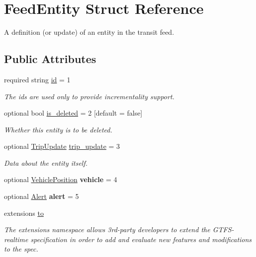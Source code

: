 \hypertarget{structFeedEntity}{}\section{Feed\+Entity Struct Reference}
\label{structFeedEntity}


A definition (or update) of an entity in the transit feed.  


\subsection*{Public Attributes}
\begin{DoxyCompactItemize}
\item 
required string \hyperlink{structFeedEntity_ad96aa1c86c0940151a63b55e75bd9197}{id} = 1
\begin{DoxyCompactList}\small\item\em The ids are used only to provide incrementality support. \end{DoxyCompactList}\item 
optional bool \hyperlink{structFeedEntity_aacce46cb6514b5ad2cf66559abdcfba3}{is\+\_\+deleted} = 2 \mbox{[}default = false\mbox{]}
\begin{DoxyCompactList}\small\item\em Whether this entity is to be deleted. \end{DoxyCompactList}\item 
optional \hyperlink{structTripUpdate}{Trip\+Update} \hyperlink{structFeedEntity_a0951149769058b1b3a93ef41a5faa96a}{trip\+\_\+update} = 3
\begin{DoxyCompactList}\small\item\em Data about the entity itself. \end{DoxyCompactList}\item 
optional \hyperlink{structVehiclePosition}{Vehicle\+Position} {\bfseries vehicle} = 4\hypertarget{structFeedEntity_af6527822a8363d699b6449ae199a9517}{}\label{structFeedEntity_af6527822a8363d699b6449ae199a9517}

\item 
optional \hyperlink{structAlert}{Alert} {\bfseries alert} = 5\hypertarget{structFeedEntity_a9bc8bedc0a343f5c9e56e9995c7da60a}{}\label{structFeedEntity_a9bc8bedc0a343f5c9e56e9995c7da60a}

\item 
extensions \hyperlink{structFeedEntity_a9fa773cfd301e2fa0ddb389df46d9bd4}{to}
\begin{DoxyCompactList}\small\item\em The extensions namespace allows 3rd-\/party developers to extend the G\+T\+F\+S-\/realtime specification in order to add and evaluate new features and modifications to the spec. \end{DoxyCompactList}\end{DoxyCompactItemize}


